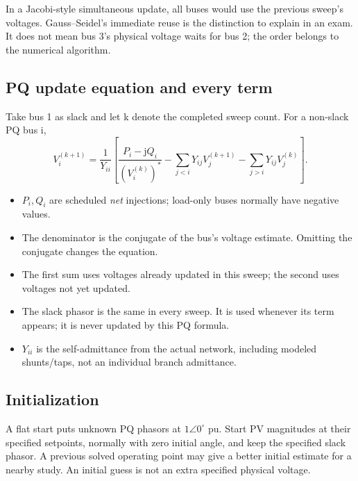 \documentclass[11pt,a4paper]{article}
\newcommand{\jj}{\mathrm j}
\begin{document}
In a Jacobi-style simultaneous update, all buses would use the previous sweep's voltages. Gauss--Seidel's immediate reuse is the distinction to explain in an exam. It does not mean bus 3's physical voltage waits for bus 2; the order belongs to the numerical algorithm.
\subsection{PQ update equation and every term}
Take bus 1 as slack and let k denote the completed sweep count. For a non-slack PQ bus i,
\[
\boxed{V_i^{(k+1)}=\frac{1}{Y_{ii}}\left[
\frac{P_i-\jj Q_i}{(V_i^{(k)})^*}
-\sum_{j<i}Y_{ij}V_j^{(k+1)}
-\sum_{j>i}Y_{ij}V_j^{(k)}\right]}.
\]
\begin{itemize}
\item $P_i,Q_i$ are scheduled \emph{net} injections; load-only buses normally have negative values.
\item The denominator is the conjugate of the bus's voltage estimate. Omitting the conjugate changes the equation.
\item The first sum uses voltages already updated in this sweep; the second uses voltages not yet updated.
\item The slack phasor is the same in every sweep. It is used whenever its term appears; it is never updated by this PQ formula.
\item $Y_{ii}$ is the self-admittance from the actual network, including modeled shunts/taps, not an individual branch admittance.
\end{itemize}
\subsection{Initialization}
A flat start puts unknown PQ phasors at $1\angle0^\circ$ pu. Start PV magnitudes at their specified setpoints, normally with zero initial angle, and keep the specified slack phasor. A previous solved operating point may give a better initial estimate for a nearby study. An initial guess is not an extra specified physical voltage.
\end{document}
